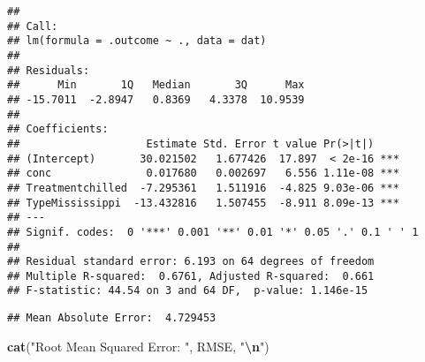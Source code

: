 \documentclass[
]{article}
\newenvironment{Shaded}{\begin{snugshade}}{\end{snugshade}}
\newcommand{\AttributeTok}[1]{\textcolor[rgb]{0.13,0.29,0.53}{#1}}
\newcommand{\DecValTok}[1]{\textcolor[rgb]{0.00,0.00,0.81}{#1}}
\newcommand{\FunctionTok}[1]{\textcolor[rgb]{0.13,0.29,0.53}{\textbf{#1}}}
\newcommand{\NormalTok}[1]{#1}
\newcommand{\OtherTok}[1]{\textcolor[rgb]{0.56,0.35,0.01}{#1}}
\newcommand{\SpecialCharTok}[1]{\textcolor[rgb]{0.81,0.36,0.00}{\textbf{#1}}}
\newcommand{\StringTok}[1]{\textcolor[rgb]{0.31,0.60,0.02}{#1}}
\begin{document}
\begin{verbatim}
## 
## Call:
## lm(formula = .outcome ~ ., data = dat)
## 
## Residuals:
##      Min       1Q   Median       3Q      Max 
## -15.7011  -2.8947   0.8369   4.3378  10.9539 
## 
## Coefficients:
##                    Estimate Std. Error t value Pr(>|t|)    
## (Intercept)       30.021502   1.677426  17.897  < 2e-16 ***
## conc               0.017680   0.002697   6.556 1.11e-08 ***
## Treatmentchilled  -7.295361   1.511916  -4.825 9.03e-06 ***
## TypeMississippi  -13.432816   1.507455  -8.911 8.09e-13 ***
## ---
## Signif. codes:  0 '***' 0.001 '**' 0.01 '*' 0.05 '.' 0.1 ' ' 1
## 
## Residual standard error: 6.193 on 64 degrees of freedom
## Multiple R-squared:  0.6761, Adjusted R-squared:  0.661 
## F-statistic: 44.54 on 3 and 64 DF,  p-value: 1.146e-15
\end{verbatim}

\begin{Shaded}
\end{Shaded}

\begin{verbatim}
## Mean Absolute Error:  4.729453
\end{verbatim}

\begin{Shaded}
\begin{Highlighting}[]
\FunctionTok{cat}\NormalTok{(}\StringTok{"Root Mean Squared Error: "}\NormalTok{, RMSE, }\StringTok{"}\SpecialCharTok{\textbackslash{}n}\StringTok{"}\NormalTok{)}
\end{Highlighting}
\end{Shaded}
\end{document}
